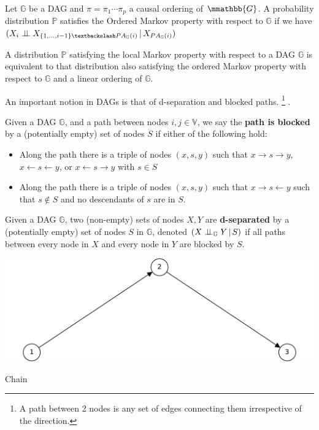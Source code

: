 \documentclass{tufte-book}
\begin{document}
\begin{definition}\label{orderedmarkov}
Let $\mathbb{G}$ be a DAG and $\pi = \pi_1 \cdots \pi_p$ a causal ordering of $\mmathbb{G}$. A probability distribution $\mathbb{P}$ satisfies the Ordered Markov property with respect to $\mathbb{G}$ if we have $(X_i \indep X_{\{1,...,i-1 \} \textbackslash PA_{\mathbb{G}}(i)}\,|\, X_{PA_{\mathbb{G}}(i)})$ 
\end{definition}

A distribution \(\mathbb{P}\) satisfying the local Markov property with respect to a DAG \(\mathbb{G}\) is equivalent to that distribution also satisfying the ordered Markov property with respect to \(\mathbb{G}\) and a linear ordering of \(\mathbb{G}\).


An important notion in DAGs is that of d-separation and blocked paths.
  \footnote{\baselineskip \baselineskip A path between 2 nodes is any set of edges connecting them irrespective of the direction.} .


\begin{definition}\label{bpath}

Given a DAG $\mathbb{G}$, and a path between nodes $i,j \in \mathbb{V}$, we say the \textbf{path is blocked} by a (potentially empty) set of nodes $S$ if either of the following hold:
\begin{itemize}
\item Along the path there is a triple of nodes $(x,s,y)$ such that $x \rightarrow s \rightarrow y$, $x \leftarrow s \leftarrow y$, or $x \leftarrow s \rightarrow y$ with $s \in S$
\item Along the path there is a triple of nodes $(x,s,y)$ such that $x \rightarrow s \leftarrow y$ such that $s \notin S$ and no descendants of $s$ are in $S$.
\end{itemize}

\end{definition}


\begin{definition}[d-separation]\label{def:dsep}

Given a DAG $\mathbb{G}$,  two (non-empty) sets of nodes $X,Y$ are \textbf{d-separated} by a (potentially empty) set of nodes $S$ in $\mathbb{G}$, denoted $(X\perp \!\!\! \perp_{\mathbb{G}}Y\,|\,S)$ if all paths between every node in $X$ and every node in $Y$ are blocked by $S$. 

\end{definition}

 \begin{marginfigure} \includegraphics[width=\linewidth]{ ./figures/chainl.pdf}\caption{ Chain} \end{marginfigure} 
\end{document}
